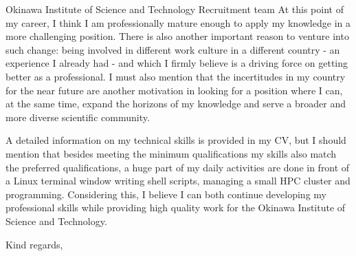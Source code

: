 \documentclass[11pt]{letter}
\begin{document}
\begin{letter}{Okinawa Institute of Science and Technology Recruitment team}
  At this point of my career, I think I am professionally mature enough to apply my knowledge in a more
  challenging position. There is also another important reason to venture into such change: being involved in different
  work culture in a different country - an experience I already had - and which I firmly believe is a driving force
  on getting better as a professional. I must also mention that the incertitudes in my country for the near future are another motivation in looking for a position where I can, at the same time, expand the horizons of my knowledge and serve a broader and more diverse scientific community.

  A detailed information on my technical skills is provided in my CV, but I should mention that besides meeting the minimum qualifications my skills also match the preferred qualifications, a huge part of my daily activities are done in front of a Linux terminal window writing shell scripts, managing a small HPC cluster and programming.
  Considering this, I believe I can both continue developing my professional skills while providing high quality work
  for the Okinawa Institute of Science and Technology.
  
  \closing{Kind regards,}

  
\end{letter}
\end{document}
